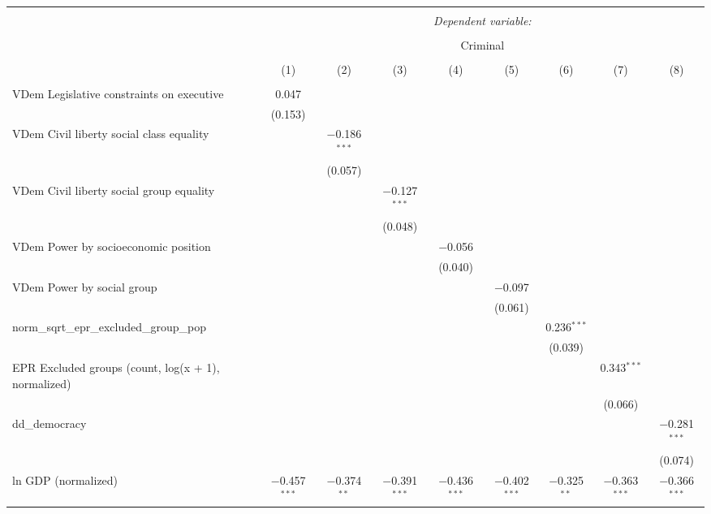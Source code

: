 
\begin{sidewaystable}[!htbp] \centering 
  \caption{} 
  \label{} 
\tiny 
\begin{tabular}{@{\extracolsep{5pt}}lcccccccc} 
\\[-1.8ex]\hline 
\hline \\[-1.8ex] 
 & \multicolumn{8}{c}{\textit{Dependent variable:}} \\ 
\cline{2-9} 
\\[-1.8ex] & \multicolumn{8}{c}{Criminal} \\ 
\\[-1.8ex] & (1) & (2) & (3) & (4) & (5) & (6) & (7) & (8)\\ 
\hline \\[-1.8ex] 
 VDem Legislative constraints on executive & 0.047 &  &  &  &  &  &  &  \\ 
  & (0.153) &  &  &  &  &  &  &  \\ 
  VDem Civil liberty social class equality &  & $-$0.186$^{***}$ &  &  &  &  &  &  \\ 
  &  & (0.057) &  &  &  &  &  &  \\ 
  VDem Civil liberty social group equality &  &  & $-$0.127$^{***}$ &  &  &  &  &  \\ 
  &  &  & (0.048) &  &  &  &  &  \\ 
  VDem Power by socioeconomic position &  &  &  & $-$0.056 &  &  &  &  \\ 
  &  &  &  & (0.040) &  &  &  &  \\ 
  VDem Power by social group &  &  &  &  & $-$0.097 &  &  &  \\ 
  &  &  &  &  & (0.061) &  &  &  \\ 
  norm\_sqrt\_epr\_excluded\_group\_pop &  &  &  &  &  & 0.236$^{***}$ &  &  \\ 
  &  &  &  &  &  & (0.039) &  &  \\ 
  EPR Excluded groups (count, log(x + 1), normalized) &  &  &  &  &  &  & 0.343$^{***}$ &  \\ 
  &  &  &  &  &  &  & (0.066) &  \\ 
  dd\_democracy &  &  &  &  &  &  &  & $-$0.281$^{***}$ \\ 
  &  &  &  &  &  &  &  & (0.074) \\ 
  ln GDP (normalized) & $-$0.457$^{***}$ & $-$0.374$^{**}$ & $-$0.391$^{***}$ & $-$0.436$^{***}$ & $-$0.402$^{***}$ & $-$0.325$^{**}$ & $-$0.363$^{***}$ & $-$0.366$^{***}$ \\ 

\end{tabular}
\end{sidewaystable}
